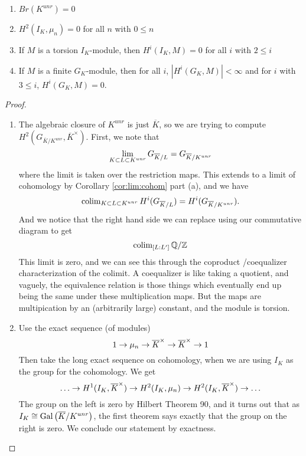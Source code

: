 \begin{corollary}
	\begin{enumerate}[(1)]
		\item \(Br(K^{unr}) = 0\)
		\item \(H^{2}(I_{K},\mu_{n}) = 0\) for all \(n\) with \(0 \leq n\)
		\item If \(M\) is a torsion \(I_{K}\)-module, then
			\(H^{i}(I_{K},M) = 0\) for all \(i\) with \(2 \leq i\)
		\item If \(M\) is a finite \(G_{K}\)-module, then
			for all \(i\), \(\left| H^{i}(G_{K},M) \right| < \infty\) 
			and for \(i\) with \(3 \leq i\), 
			\(H^{i}(G_{K},M) = 0\).
	\end{enumerate}
\end{corollary}



\begin{proof}
	\begin{enumerate}[(1)]
		\item The algebraic closure of \(K^{unr}\) is just \(\overline{K}\),
			so we are trying to compute 
			\(H^{2}(G_{\overline{K} / K^{unr}},\overline{K}^{\times})\).
			First, we note that
			 \[
			 \lim_{K \subset L \subset K^{unr}} G_{\overline{K} / L} 
			 = G_{\overline{K} / K^{unr}}
			 \] 
			where the limit is taken over the restriction maps.
			This extends to a limit of cohomology by 
			Corollary \ref{cor:lim:cohom} part (a), and
			we have
			\[
				\operatorname{colim}_{K \subset L \subset K^{unr}} H^{i}(G_{\overline{K} / L}) 
				= H^{i}(G_{\overline{K} / K^{unr}})
			.\] 
			And we notice that the right hand side we can replace using
			our commutative diagram to get
			\[
				\operatorname{colim}_{[L:L^{\prime}]} \mathbb{Q} / \mathbb{Z}
			\] 
			This limit is zero, and we can see this through the coproduct
			/coequalizer characterization of the colimit. 
			A coequalizer is like taking a quotient, and vaguely, the 
			equivalence relation is those things which eventually end up being
			the same under these multiplication maps. 
			But the maps are multipication by an (arbitrarily large) constant,
			and the module is torsion.
		\item Use the exact sequence (of modules) 
			\[
			1 \to \mu_{n} \to \overline{K}^{\times} \to \overline{K}^{\times}
			\to 1
			\] 
			Then take the long exact sequence on cohomology, when we are using
			\(I_{K}\) as the group for the cohomology.
			We get 
			\[
				\ldots \to H^{1}(I_{K},\overline{K}^{\times}) \to
				H^{2}(I_{K}, \mu_{n}) \to H^{2}(I_{K},\overline{K}^{\times})
				\to \ldots
			\] 
			The group on the left is zero by Hilbert Theorem 90, and
			it turns out that as \(I_{K} \cong \operatorname{Gal}\left( 
			\overline{K} / K^{unr} \right)\), the first theorem 
			says exactly that the group on the right is zero. 
			We conclude our statement by exactness.
			

\end{enumerate}
\end{proof}
